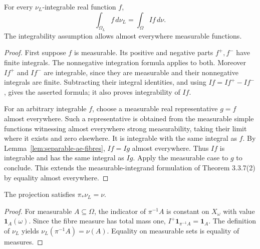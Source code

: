 \begin{theorem}\label{thm:separable-integral}
\leanok
{}
For every $\nu_L$-integrable real function $f$,
\[
 \int_{\Omega_L}f\,d\nu_L=\int_\Omega If\,d\nu.
\]
The integrability assumption allows almost everywhere measurable functions.
\end{theorem}
\begin{proof}
First suppose $f$ is measurable. Its positive and negative parts $f^+,f^-$
have finite integrals. The nonnegative integration formula applies to both.
Moreover $If^+$ and $If^-$ are integrable, since they are measurable and
their nonnegative integrals are finite. Subtracting their integral
identities, and using $If=If^+-If^-$, gives the asserted formula; it
also proves integrability of $If$.

For an arbitrary integrable $f$, choose a measurable real representative
$g=f$ almost everywhere. Such a representative is obtained from the
measurable simple functions witnessing almost everywhere strong
measurability, taking their limit where it exists and zero elsewhere.
It is integrable with the same integral as $f$. By
Lemma~\ref{lem:separable-ae-fibres}, $If=Ig$ almost everywhere. Thus $If$
is integrable and has the same integral as $Ig$. Apply the measurable
case to $g$ to conclude. This extends the measurable-integrand formulation
of Theorem 3.3.7(2) by equality almost everywhere.
\end{proof}

\begin{proposition}\label{prop:separable-pushforward}
\leanok
{}
The projection satisfies $\pi_*\nu_L=\nu$.
\end{proposition}
\begin{proof}
For measurable $A\subseteq\Omega$, the indicator of $\pi^{-1}A$ is
constant on $X_\omega$ with value $\mathbf1_A(\omega)$. Since the fibre
measure has total mass one, $I^+\mathbf1_{\pi^{-1}A}=\mathbf1_A$.
The definition of $\nu_L$ yields $\nu_L(\pi^{-1}A)=\nu(A)$.
Equality on measurable sets is equality of measures.
\end{proof}

